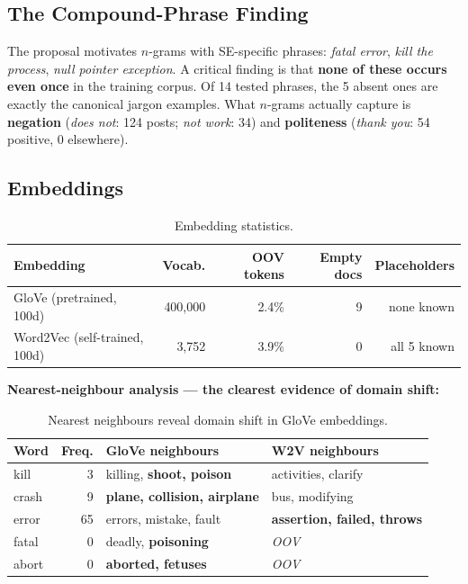 \documentclass[11pt,a4paper]{article}
\begin{document}
\subsection{The Compound-Phrase Finding}

The proposal motivates $n$-grams with SE-specific phrases: \textit{fatal error}, \textit{kill the process}, \textit{null pointer exception}. A critical finding is that \textbf{none of these occurs even once} in the training corpus. Of 14 tested phrases, the 5 absent ones are exactly the canonical jargon examples. What $n$-grams actually capture is \textbf{negation} (\textit{does not}: 124 posts; \textit{not work}: 34) and \textbf{politeness} (\textit{thank you}: 54 positive, 0 elsewhere).

\subsection{Embeddings}

\begin{table}[H]
\centering
\caption{Embedding statistics.}
\label{tab:embed}
\begin{tabular}{lrrrr}
\toprule
\textbf{Embedding} & \textbf{Vocab.} & \textbf{OOV tokens} & \textbf{Empty docs} & \textbf{Placeholders} \\
\midrule
GloVe (pretrained, 100d) & 400,000 & 2.4\% & 9 & none known \\
Word2Vec (self-trained, 100d) & 3,752 & 3.9\% & 0 & all 5 known \\
\bottomrule
\end{tabular}
\end{table}

\textbf{Nearest-neighbour analysis --- the clearest evidence of domain shift:}

\begin{table}[H]
\centering
\caption{Nearest neighbours reveal domain shift in GloVe embeddings.}
\label{tab:neighbours}
\begin{tabular}{lrll}
\toprule
\textbf{Word} & \textbf{Freq.} & \textbf{GloVe neighbours} & \textbf{W2V neighbours} \\
\midrule
kill      & 3  & killing, \textbf{shoot, poison} & activities, clarify \\
crash     & 9  & \textbf{plane, collision, airplane} & bus, modifying \\
error     & 65 & errors, mistake, fault & \textbf{assertion, failed, throws} \\
fatal     & 0  & deadly, \textbf{poisoning} & \textit{OOV} \\
abort     & 0  & \textbf{aborted, fetuses} & \textit{OOV} \\
\bottomrule
\end{tabular}
\end{table}
\end{document}

